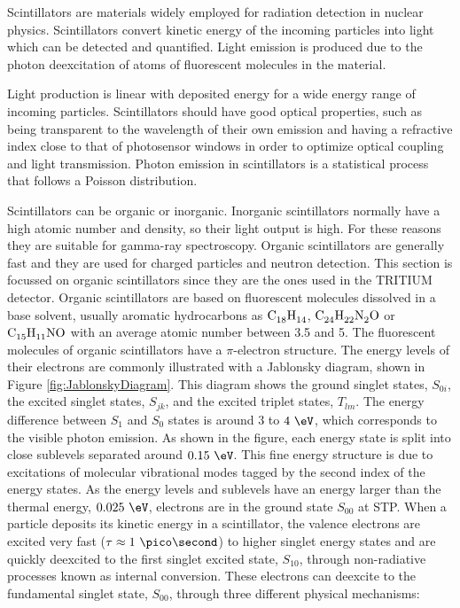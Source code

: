 Scintillators are materials widely employed for radiation detection in nuclear physics. Scintillators convert kinetic energy of the incoming particles into light which can be detected and quantified. Light emission is produced due to the photon deexcitation of atoms of fluorescent molecules in the material.

Light production is linear with deposited energy for a wide energy range of incoming particles. Scintillators should have good optical properties, such as being transparent to the wavelength of their own emission and having a refractive index close to that of photosensor windows in order to optimize optical coupling and light transmission. Photon emission in scintillators is a statistical process that follows a Poisson distribution.

Scintillators can be organic or inorganic. Inorganic scintillators normally have a high atomic number and density, so their light output is high. For these reasons they are suitable for gamma-ray spectroscopy. Organic scintillators are generally fast and they are used for charged particles and neutron detection. This section is focussed on organic scintillators since they are the ones used in the TRITIUM detector. Organic scintillators are based on fluorescent molecules dissolved in a base solvent, usually aromatic hydrocarbons as $\ce{C_{18}H_{14}}$, $\ce{C_{24}H_{22}N_{2}O}$ or $\ce{C_{15}H_{11}NO}$ with an average atomic number between 3.5 and 5. The fluorescent molecules of organic scintillators have a $\pi$-electron structure. The energy levels of their electrons are commonly illustrated with a Jablonsky diagram, shown in Figure \ref{fig:JablonskyDiagram}. This diagram shows the ground singlet states, $S_{0i}$, the excited singlet states, $S_{jk}$, and the excited triplet states, $T_{lm}$. The energy difference between $S_1$ and $S_0$ states is around $3$ to $4~\eV$, which corresponds to the visible photon emission. As shown in the figure, each energy state is split into close sublevels separated around $0.15~\eV$. This fine energy structure is due to excitations of molecular vibrational modes tagged by the second index of the energy states. As the energy levels and sublevels have an energy larger than the thermal energy, $0.025~\eV$, electrons are in the ground state $S_{00}$ at STP. When a particle deposits its kinetic energy in a scintillator, the valence electrons are excited very fast ($\tau \approx 1~\pico\second$) to higher singlet energy states and are quickly deexcited to the first singlet excited state, $S_{10}$, through non-radiative processes known as internal conversion. These electrons can deexcite to the fundamental singlet state, $S_{00}$, through three different physical mechanisms:


